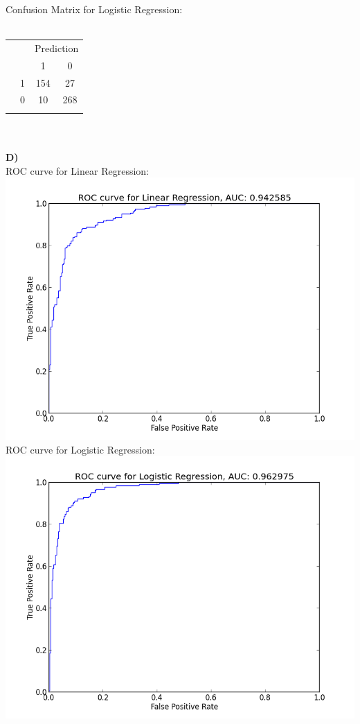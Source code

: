 \documentclass[11pt,a4paper,fleqn]{article}
\begin{document}
 Confusion Matrix for Logistic Regression:\\ \\
\begin{tabular}{cc|c|c|}
\multicolumn{2}{c}{}&\multicolumn{2}{c}{Prediction}\\
\multicolumn{2}{c}{}&\multicolumn{1}{c}{1}&\multicolumn{1}{c}{0}\\
\hhline{~~--}
\multirow{2}{*}{Label}
&1&154&27\\
\hhline{~~--}
&0&10&268\\
\hhline{~~--}
\end{tabular}\\ \\
\newpage \noindent
\textbf{D)} \\
ROC curve for Linear Regression:\\
\includegraphics[scale=0.6]{ROC_Linear_Regression.png}\\
ROC curve for Logistic Regression:\\
\includegraphics[scale=0.6]{ROC_Logistic_Regression.png}\\
\end{document}
